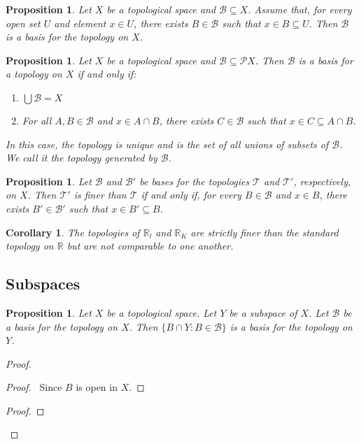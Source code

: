 \documentclass{book}
\let\qed\relax
\newtheorem{prop}[ax]{Proposition}
\newtheorem{cor}{Corollary}[ax]
\theoremstyle{definition}
\begin{document}
\begin{prop}
Let $X$ be a topological space and $\mathcal{B} \subseteq X$. Assume that, for every open set $U$ and element $x \in U$, there exists $B \in \mathcal{B}$ such that $x \in B \subseteq U$. Then $\mathcal{B}$ is a basis for the topology on $X$.
\end{prop}

\begin{prop}
Let $X$ be a topological space and $\mathcal{B} \subseteq \mathcal{P} X$. Then $\mathcal{B}$ is a basis for a topology on $X$ if and only if:
\begin{enumerate}
\item $\bigcup \mathcal{B} = X$
\item For all $A, B \in \mathcal{B}$ and $x \in A \cap B$, there exists $C \in \mathcal{B}$ such that $x \in C \subseteq A \cap B$.
\end{enumerate}
In this case, the topology is unique and is the set of all unions of subsets of $\mathcal{B}$. We call it the topology \emph{generated} by $\mathcal{B}$.
\end{prop}

\begin{prop}
Let $\mathcal{B}$ and $\mathcal{B}'$ be bases for the topologies $\mathcal{T}$ and $\mathcal{T}'$, respectively, on $X$. Then $\mathcal{T}'$ is finer than $\mathcal{T}$ if and only if, for every $B \in \mathcal{B}$ and $x \in B$, there exists $B' \in \mathcal{B}'$ such that $x \in B' \subseteq B$.
\end{prop}

\begin{cor}
The topologies of $\mathbb{R}_l$ and $\mathbb{R}_K$ are strictly finer than the standard topology on $\mathbb{R}$ but are not comparable to one another.
\end{cor}

\subsection{Subspaces}

\begin{prop}
\label{prop:basis_subspace}
Let $X$ be a topological space. Let $Y$ be a subspace of $X$. Let $\mathcal{B}$ be a basis for the topology on $X$. Then $\{ B \cap Y : B \in \mathcal{B} \}$ is a basis for the topology on $Y$.
\end{prop}

\begin{proof}
\pf
{}
\begin{proof}
	\pf\ Since $B$ is open in $X$.
\end{proof}
\begin{proof}
\end{proof}
\qed
\end{proof}
\end{document}

